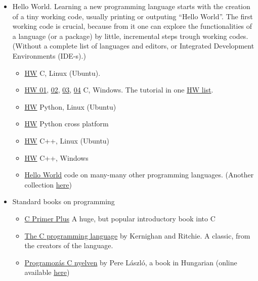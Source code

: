 \documentclass{article}
\begin{document}
\begin{itemize}
    \item Hello World. Learning a new programming language starts with the creation of a tiny working code, usually printing or outputing ``Hello World''.  The first working code is crucial, because from it one can explore the functionalities of a language (or a package) by little, incremental steps trough working codes. (Without a complete list of languages and editors, or Integrated Development Environments (IDE-s).)
    \begin{itemize}
        \item \href{https://www.youtube.com/watch?v=87u667BoHkg}{HW} C, Linux (Ubuntu).
        \item \href{https://www.youtube.com/watch?v=2NWeucMKrLI}{HW 01}, \href{https://www.youtube.com/watch?v=3DeLiClDd04}{02}, \href{https://www.youtube.com/watch?v=iWx3yyFMWQA}{03}, \href{https://www.youtube.com/watch?v=oSpmApiUsHw}{04} C, Windows. The tutorial in one \href{https://www.youtube.com/playlist?list=PL6gx4Cwl9DGAKIXv8Yr6nhGJ9Vlcjyymq}{HW list}.
        \item \href{https://www.youtube.com/watch?v=98fYq1BIOEk}{HW} Python, Linux (Ubuntu)
        \item \href{https://www.youtube.com/watch?v=KOdfpbnWLVo}{HW} Python cross platform
        \item \href{https://www.youtube.com/watch?v=yXMb7SC9gHg}{HW} C++, Linux (Ubuntu)
        \item \href{https://www.youtube.com/watch?v=VBjEoGX5rFI}{HW} C++, Windows
        \item \href{http://rosettacode.org/wiki/Hello_world/Text}{Hello World} code on many-many other programming languages. (Another collection \href{http://helloworldcollection.de/}{here})
    \end{itemize}
    
    \item Standard books on programming
    \begin{itemize}
        \item \href{https://www.goodreads.com/book/show/120642.C_Primer_Plus}{C Primer Plus} A huge, but popular introductory book into C
        \item \href{https://www.goodreads.com/book/show/515601.The_C_Programming_Language}{The C     programming language} by Kernighan and Ritchie. A classic, from the creators of the language.
        
        \item \href{https://moly.hu/konyvek/pere-laszlo-unix-gnu-linux-programozas-c-nyelven}{Programozás C nyelven} by Pere László, a book in Hungarian (online available \href{https://people.inf.elte.hu/budraai/Prog/c\%20prog.pdf}{here})
        

\end{itemize}
\end{itemize}
\end{document}
